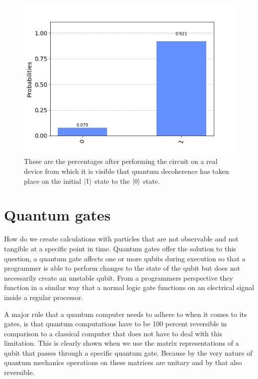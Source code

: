 \begin{figure}[h]
	\centering
	\includegraphics[scale = 0.75]{../Demonstration/img/Quantum_decoherence_graph.PNG}
	\caption{These are the percentages after performing the circuit on a real device from which it is visible that quantum decoherence has taken place on the initial $\ket{1}$ state to the $\ket{0}$ state.}
\end{figure}



\section{Quantum gates}

How do we create calculations with particles that are not observable and not tangible at a specific point in time. Quantum gates offer the solution to this question, a quantum gate affects one or more qubits during execution so that a programmer is able to perform changes to the state of the qubit but does not necessarily create an unstable qubit. From a programmers perspective they function in a similar way that a normal logic gate functions on an electrical signal inside a regular processor. 

A major rule that a quantum computer needs to adhere  to when it comes to its gates, is that quantum computations have to be 100 percent reversible in comparison to a classical computer that does not have to deal with this limitation. This is clearly shown when we use the matrix representations of a qubit that passes through a specific quantum gate. Because by the very nature of quantum mechanics operations on these matrices are unitary and by that also reversible.


